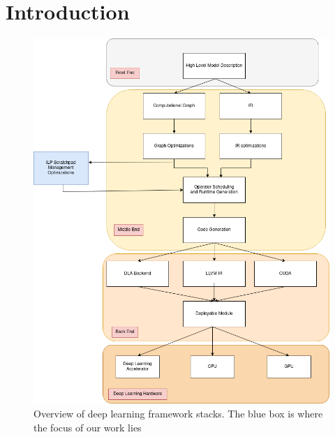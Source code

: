\chapter{Introduction} %

\label{Chapter1} %
\begin{figure}[th]
\centering
\includegraphics[scale=0.5]{Figures/framework_stack_with_extension.png}
\decoRule
\caption[Overview of Deep Learning Frameworks]{Overview of deep learning framework stacks. The blue box
is where the focus of our work lies}
\label{fig:dlFramework}
\end{figure}

